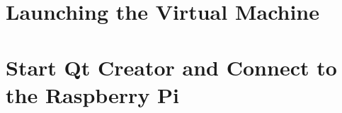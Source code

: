 \documentclass{article}
\begin{document}
\section{Launching the Virtual Machine}




\section{Start Qt Creator and Connect to the Raspberry Pi}







	
	







\end{document}
